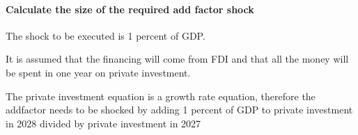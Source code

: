 \documentclass[letterpaper,10pt,english]{jupyterBook}
\begin{document}
\paragraph{Calculate the size of the required add factor shock}
\label{\detokenize{content/06_WBModels/LoadingWBModel:calculate-the-size-of-the-required-add-factor-shock}}
\sphinxAtStartPar
The shock to be executed is 1 percent of GDP.

\sphinxAtStartPar
It is assumed that the financing will come from FDI and that all the money will be spent in one year on private investment.

\sphinxAtStartPar
The private investment equation is a growth rate equation, therefore the add\sphinxhyphen{}factor needs to be shocked by adding 1 percent of GDP to private investment in 2028 divided by private investment in 2027
\end{document}
